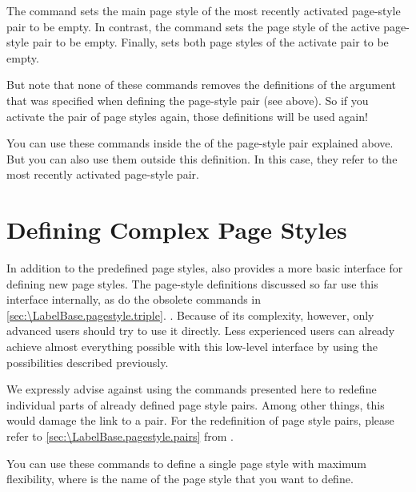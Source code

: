 \begin{Declaration}
\end{Declaration}
The  command sets the main page style of
the most recently activated page-style pair to be empty. In contrast, the
 command sets the  page
style of the active page-style pair to be empty. Finally,
 sets both page styles of the activate pair to be
empty.

But note that none of these commands removes the
definitions of the  argument that was specified when
defining the page-style pair (see above). So if you activate the pair of page
styles again, those definitions will be used again!

You can use these commands inside the  of the page-style
pair explained above. But you can also use them outside this definition. In
this case, they refer to the most recently activated page-style pair.%
\EndIndexGroup


\section{Defining Complex Page Styles}

In addition to the predefined page styles,  also
provides a more basic interface for defining new page styles. The page-style
definitions discussed so far use this interface internally, as do the obsolete
commands in \autoref{sec:\LabelBase.pagestyle.triple}.
. Because of its complexity, however, only advanced
users should try to use it directly. Less experienced users can already
achieve almost everything possible with this low-level interface by using the
possibilities described previously.

We expressly advise against using the commands presented here to redefine
individual parts of already defined page style pairs. Among other things, this
would damage the link to a pair. For the redefinition of page style pairs,
please refer to \autoref{sec:\LabelBase.pagestyle.pairs} from
.

\begin{Declaration}
\end{Declaration}
You can use these commands to define a single page style with maximum
flexibility, where  is the name of the page style that you want to
define.

